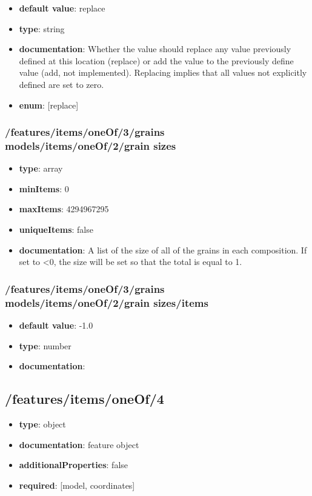 \begin{itemize}\item {\bf default value}: replace
\item {\bf type}: string
\item {\bf documentation}: Whether the value should replace any value previously defined at this location (replace) or add the value to the previously define value (add, not implemented). Replacing implies that all values not explicitly defined are set to zero.
\item {\bf enum}: [replace]\end{itemize}\subsubsection{/features/items/oneOf/3/grains models/items/oneOf/2/grain sizes}
\begin{itemize}\item {\bf type}: array
\item {\bf minItems}: 0
\item {\bf maxItems}: 4294967295
\item {\bf uniqueItems}: false
\item {\bf documentation}: A list of the size of all of the grains in each composition. If set to <0, the size will be set so that the total is equal to 1.
\end{itemize}\subsubsection{/features/items/oneOf/3/grains models/items/oneOf/2/grain sizes/items}
\begin{itemize}\item {\bf default value}: -1.0
\item {\bf type}: number
\item {\bf documentation}: 
\end{itemize}\subsection{/features/items/oneOf/4}
\begin{itemize}\item {\bf type}: object
\item {\bf documentation}: feature object
\item {\bf additionalProperties}: false
\item {\bf required}: [model, coordinates]\end{itemize}
